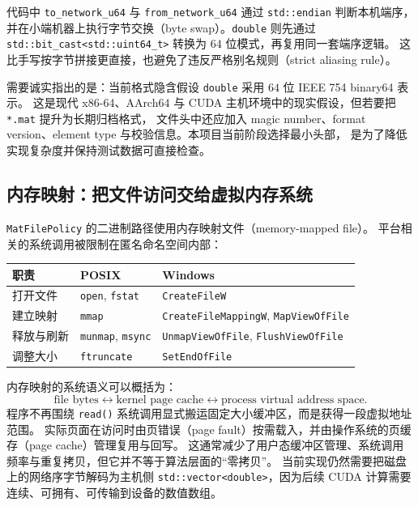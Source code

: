 代码中 \texttt{to\_network\_u64} 与 \texttt{from\_network\_u64} 通过 \texttt{std::endian}
判断本机端序，并在小端机器上执行字节交换（byte swap）。\texttt{double} 则先通过
\texttt{std::bit\_cast<std::uint64\_t>} 转换为 $64$ 位模式，再复用同一套端序逻辑。
这比手写按字节拼接更直接，也避免了违反严格别名规则（strict aliasing rule）。

需要诚实指出的是：当前格式隐含假设 \texttt{double} 采用 $64$ 位 IEEE 754 binary64 表示。
这是现代 x86-64、AArch64 与 CUDA 主机环境中的现实假设，但若要把 \texttt{*.mat} 提升为长期归档格式，
文件头中还应加入 magic number、format version、element type 与校验信息。本项目当前阶段选择最小头部，
是为了降低实现复杂度并保持测试数据可直接检查。

\subsection{内存映射：把文件访问交给虚拟内存系统}

\texttt{MatFilePolicy} 的二进制路径使用内存映射文件（memory-mapped file）。
平台相关的系统调用被限制在匿名命名空间内部：

\begin{table}[htbp]
    \centering
    \begin{tabular}{lll}
        \toprule
        职责    & POSIX                           & Windows                                             \\
        \midrule
        打开文件  & \texttt{open}, \texttt{fstat}   & \texttt{CreateFileW}                                \\
        建立映射  & \texttt{mmap}                   & \texttt{CreateFileMappingW}, \texttt{MapViewOfFile} \\
        释放与刷新 & \texttt{munmap}, \texttt{msync} & \texttt{UnmapViewOfFile}, \texttt{FlushViewOfFile}  \\
        调整大小  & \texttt{ftruncate}              & \texttt{SetEndOfFile}                               \\
        \bottomrule
    \end{tabular}
\end{table}

内存映射的系统语义可以概括为：
\[
    \text{file bytes}
    \longleftrightarrow
    \text{kernel page cache}
    \longleftrightarrow
    \text{process virtual address space}.
\]
程序不再围绕 \texttt{read()} 系统调用显式搬运固定大小缓冲区，而是获得一段虚拟地址范围。
实际页面在访问时由页错误（page fault）按需载入，并由操作系统的页缓存（page cache）管理复用与回写。
这通常减少了用户态缓冲区管理、系统调用频率与重复拷贝，但它并不等于算法层面的“零拷贝”。
当前实现仍然需要把磁盘上的网络序字节解码为主机侧 \texttt{std::vector<double>}，因为后续 CUDA 计算需要
连续、可拥有、可传输到设备的数值数组。

